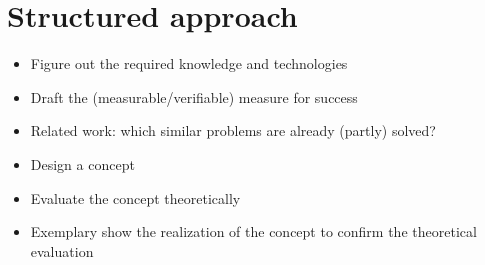 \section{Structured approach}
\begin{itemize}
	\item{Figure out the required knowledge and technologies}
	\item{Draft the (measurable/verifiable) measure for success}
	\item{Related work: which similar problems are already (partly) solved?}
	\item{Design a concept}
	\item{Evaluate the concept theoretically}
	\item{Exemplary show the realization of the concept to confirm the theoretical evaluation}
\end{itemize}